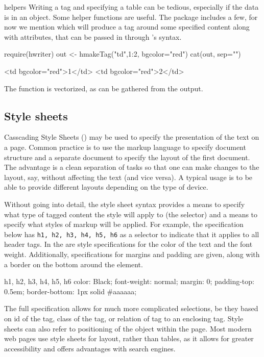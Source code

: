 \begin{example}{\R\/ helpers}{}
  Writing a tag and specifying a table can be tedious, especially if
  the data is in an \R\/ object. Some helper functions are useful. The
   package includes a few, for now
  we mention  which will produce a tag around some
  specified content along with attributes, that can be passed in
  through \R's  syntax.
\begin{Schunk}
\begin{Sinput}
 require(hwriter)
 out <- hmakeTag("td",1:2, bgcolor="red")
 cat(out, sep="\n")
\end{Sinput}
\begin{Soutput}
<td bgcolor="red">1</td>
<td bgcolor="red">2</td>
\end{Soutput}
\end{Schunk}
The function is vectorized, as can be gathered from the output.
\end{example}


\subsection{Style sheets}
\label{sec:style-sheets}


Casscading Style Sheets () may be used to specify the
presentation of the text on a page. Common practice is to use the
markup language to specify document structure and a separate document
to specify the layout of the first document. The advantage is a clean
separation of tasks so that one can make changes to the layout, say,
without affecting the text (and vice versa). A typical usage is to be
able to provide different layouts depending on the type of device.

Without going into detail, the style sheet syntax provides a means to
specify what type of tagged content the style will apply to (the
selector) and a means to specify what styles of markup will be
applied. For example, the specification below has
\texttt{h1, h2, h3, h4, h5, h6} as a selector to indicate that it
applies to all header tags. In the  are style
specifications for the color of the text and the font
weight. Additionally, specifications for margins and padding are
given, along with a border on the bottom around the element.
\begin{HTMLinput}
  h1, h2, h3, h4, h5, h6 {
    color: Black;
    font-weight: normal;
    margin: 0;
    padding-top: 0.5em;
    border-bottom: 1px solid #aaaaaa;
}
\end{HTMLinput}
The full specification allows for much more complicated selections, be
they based on id of the tag, class of the tag, or relation of tag to
an enclosing tag. 
Style sheets can also refer to positioning of the object within the
page. Most modern web pages use style sheets for layout, rather than
tables, as it allows for greater accessibility and offers advantages
with search engines.


